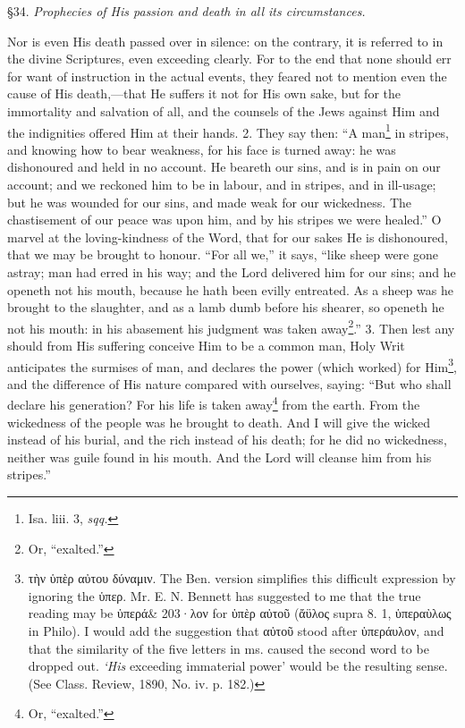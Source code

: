 
§34. \emph{Prophecies of His passion and death in all its circumstances.}

Nor is even His death passed over in silence: on the contrary, it is referred to in the divine Scriptures, even exceeding clearly. For to the end that none should err for want of instruction in the actual events, they feared not to mention even the cause of His death,—that He suffers it not for His own sake, but for the immortality and salvation of all, and the counsels of the Jews against Him and the indignities offered Him at their hands. 2. They say then: “A man\footnote{Isa. liii. 3, \emph{sqq.}} in stripes, and knowing how to bear weakness, for his face is turned away: he was dishonoured and held in no account. He beareth our sins, and is in pain on our account; and we reckoned him to be in labour, and in stripes, and in ill-usage; but he was wounded for our sins, and made weak for our wickedness. The chastisement of our peace was upon him, and by his stripes we were healed.” O marvel at the loving-kindness of the Word, that for our sakes He is dishonoured, that we may be brought to honour. “For all we,” it says, “like sheep were gone astray; man had erred in his way; and the Lord delivered him for our sins; and he openeth not his mouth, because he hath been evilly entreated. As a sheep was he brought to the slaughter, and as a lamb dumb before his shearer, so openeth he not his mouth: in his abasement his judgment was taken away\footnote{Or, “exalted.”}.” 3. Then lest any should from His suffering conceive Him to be a common man, Holy Writ anticipates the surmises of man, and declares the power (which worked) for Him\footnote{\textgreek{τὴν ὑπὲρ αὐτου δύναμιν}. The Ben. version simplifies this difficult expression by ignoring the \textgreek{ὑπερ}. Mr. E. N. Bennett has suggested to me that the true reading may be \textgreek{ὑπερά\& 203·λον} for \textgreek{ὑπὲρ αὐτοῦ} (\textgreek{ἄϋλος} supra 8. 1, \textgreek{ὑπεραὺλως} in Philo). I would add the suggestion that \textgreek{αὐτοῦ} stood after \textgreek{ὑπεράυλον}, and that the similarity of the five letters in ms. caused the second word to be dropped out. \emph{‘His} exceeding immaterial power’ would be the resulting sense. (See Class. Review, 1890, No. iv. p. 182.)}, and the difference of His nature compared with ourselves, saying: “But who shall declare his generation? For his life is taken away\footnote{Or, “exalted.”} from the earth. From the wickedness of the people was he brought to death. And I will give the wicked instead of his burial, and the rich instead of his death; for he did no wickedness, neither was guile found in his mouth. And the Lord will cleanse him from his stripes.”

